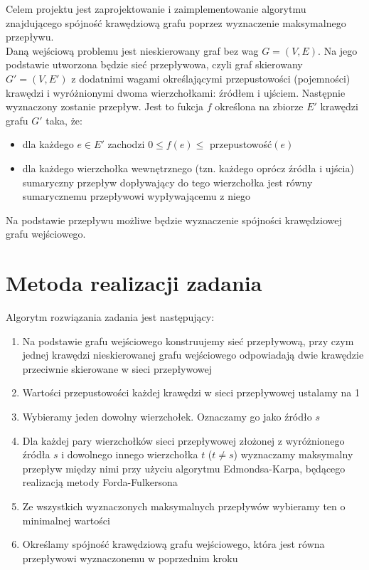 \documentclass{article}
\begin{document}
Celem projektu jest zaprojektowanie i zaimplementowanie algorytmu znajdującego spójność krawędziową grafu poprzez wyznaczenie maksymalnego przepływu.\\

Daną wejściową problemu jest nieskierowany graf bez wag $G=(V,E)$. Na jego podstawie utworzona będzie sieć przepływowa, czyli graf skierowany $G'=(V,E')$ z dodatnimi wagami określającymi przepustowości (pojemności) krawędzi i wyróżnionymi dwoma wierzchołkami: źródłem i ujściem. Następnie wyznaczony zostanie przepływ. Jest to fukcja $f$ określona na zbiorze $E'$ krawędzi grafu $G'$ taka, że:
\begin{itemize}
    \item dla każdego $e\in E'$ zachodzi $0\le f(e)\le$ przepustowość$(e)$
    \item dla każdego wierzchołka wewnętrznego (tzn. każdego oprócz źródła i ujścia) sumaryczny przepływ dopływający do tego wierzchołka jest równy sumarycznemu przepływowi wypływającemu z niego
\end{itemize}
Na podstawie przepływu możliwe będzie wyznaczenie spójności krawędziowej grafu wejściowego.


\section{Metoda realizacji zadania}

Algorytm rozwiązania zadania jest następujący:
\begin{enumerate}
\item Na podstawie grafu wejściowego konstruujemy sieć przepływową, przy czym jednej krawędzi nieskierowanej grafu wejściowego odpowiadają dwie krawędzie przeciwnie skierowane w sieci przepływowej
\item Wartości przepustowości każdej krawędzi w sieci przepływowej ustalamy na 1
\item Wybieramy jeden dowolny wierzchołek. Oznaczamy go jako źródło $s$
\item Dla każdej pary wierzchołków sieci przepływowej złożonej z wyróżnionego źródła $s$ i dowolnego innego wierzchołka $t$ ($t \neq s$) wyznaczamy maksymalny przepływ między nimi przy użyciu algorytmu Edmondsa-Karpa, będącego realizacją metody Forda-Fulkersona
\item Ze wszystkich wyznaczonych maksymalnych przepływów wybieramy ten o minimalnej wartości
\item Określamy spójność krawędziową grafu wejściowego, która jest równa przepływowi wyznaczonemu w poprzednim kroku
\end{enumerate}
\end{document}
